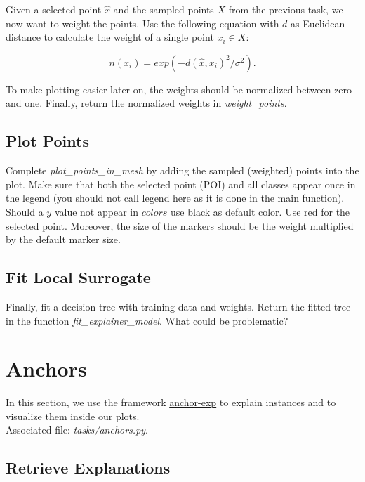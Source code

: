 \documentclass[a4paper]{article}
\begin{document}
Given a selected point $\hat{x}$ and the sampled points $X$ from the previous task, we now want to weight the points. Use the following equation with $d$ as Euclidean distance to calculate the weight of a single point $x_i \in X$:

\begin{equation}
    n(x_i) = exp(-d(\hat{x}, x_i)^2/\sigma^2).
    \label{eq:dist}
\end{equation}

\noindent To make plotting easier later on, the weights should be normalized between zero and one. Finally, return the normalized weights in \textit{weight\_points}.


\subsection{Plot Points}

Complete \textit{plot\_points\_in\_mesh} by adding the sampled (weighted) points into the plot. Make sure that both the selected point (POI) and all classes appear once in the legend (you should not call legend here as it is done in the main function). Should a $y$ value not appear in $colors$ use black as default color. Use red for the selected point. Moreover, the size of the markers should be the weight multiplied by the default marker size.


\subsection{Fit Local Surrogate}

Finally, fit a decision tree with training data and weights. Return the fitted tree in the function \textit{fit\_explainer\_model}. What could be problematic?


\section{Anchors}

In this section, we use the framework \href{https://github.com/marcotcr/anchor}{anchor-exp} to explain instances and to visualize them inside our plots.\\

\noindent Associated file: \textit{tasks/anchors.py}.


\subsection{Retrieve Explanations}
\end{document}
